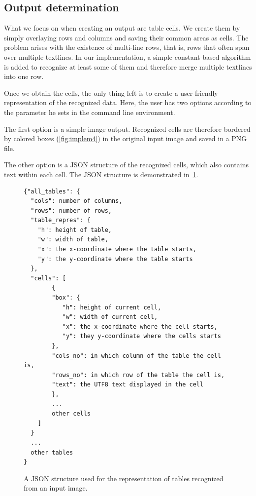 \subsection{Output determination}

What we focus on when creating an output are table cells. We create them by simply overlaying rows and columns and saving their common areas as cells. The problem arises with the existence of multi-line rows, that is, rows that often span over multiple textlines. In our implementation, a simple constant-based algorithm is added to recognize at least some of them and therefore merge multiple textlines into one row.

Once we obtain the cells, the only thing left is to create a user-friendly representation of the recognized data. Here, the user has two options according to the parameter he sets in the command line environment. 

The first option is a simple image output. Recognized cells are therefore bordered by colored boxes (\cref{fig:implem4}) in the original input image and saved in a PNG file.

The other option is a JSON structure of the recognized cells, which also contains text within each cell. The JSON structure is demonstrated in~\cref{fig:jsonout}.

\begin{figure}[p]
\begin{lstlisting}
{"all_tables": {
  "cols": number of columns,
  "rows": number of rows,
  "table_repres": {
    "h": height of table,
    "w": width of table,
    "x": the x-coordinate where the table starts,
    "y": the y-coordinate where the table starts
  },
  "cells": [
        {
        "box": {
           "h": height of current cell,
           "w": width of current cell,
           "x": the x-coordinate where the cell starts,
           "y": they y-coordinate where the cells starts
        },
        "cols_no": in which column of the table the cell is,
        "rows_no": in which row of the table the cell is,
        "text": the UTF8 text displayed in the cell
        },
        ...
        other cells
    ]
  }
  ...
  other tables
}
\end{lstlisting}
\caption{A JSON structure used for the representation of tables recognized from an input image.}
\label{fig:jsonout}
\end{figure}

